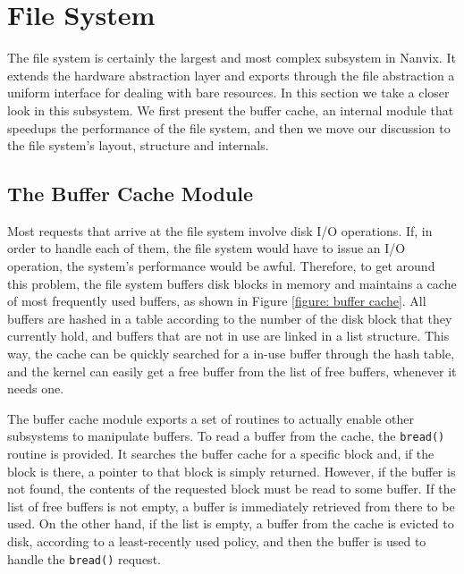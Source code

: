 \documentclass[10pt,a4paper]{article}
\begin{document}
\section{File System}
\label{section: file system}

The file system is certainly the largest and most complex subsystem in Nanvix. It extends the hardware abstraction layer and exports through the file abstraction a uniform interface for dealing with bare resources. In this section we take a closer look in this subsystem. We first present the buffer cache, an internal module that speedups the performance of the file system, and then we move our discussion to the file system's layout, structure and internals.

\subsection{The Buffer Cache Module}
\label{subsection: the buffer cache module}

Most requests that arrive at the file system involve disk I/O operations. If, in order to handle each of them, the file system would have to issue an I/O operation, the system's performance would be awful. Therefore, to get around this problem, the file system buffers disk blocks in memory and maintains a cache of most frequently used buffers, as shown in Figure \ref{figure: buffer cache}. All buffers are hashed in a table according to the number of the disk block that they currently hold, and buffers that are not in use are linked in a list structure. This way, the cache can be quickly searched for a in-use buffer through the hash table, and the kernel can easily get a free buffer from the list of free buffers, whenever it needs one.

The buffer cache module exports a set of routines to actually enable other subsystems to manipulate buffers. To read a buffer from the cache, the \texttt{bread()} routine is provided. It searches the buffer cache for a specific block and, if the block is there, a pointer to that block is simply returned. However, if the buffer is not found, the contents of the requested block must be read to some buffer. If the list of free buffers is not empty, a buffer is immediately retrieved from there to be used. On the other hand, if the list is empty, a buffer from the cache is evicted to disk, according to a least-recently used policy, and then the buffer is used to handle the \texttt{bread()} request.
\end{document}
